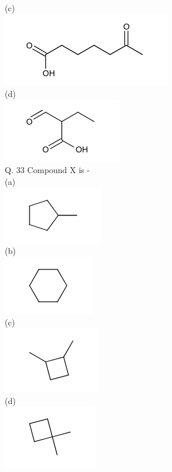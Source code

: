 \documentclass[10pt]{article}
\begin{document}
(c)\\
\includegraphics{smile-93b79b36337e5bc1e81aa86eb5efe11f89b3f004}\\
(d)\\
\includegraphics{smile-d005dd6c5a7384145c794ea92079eb066e6075c4}\\
Q. 33 Compound X is -\\
(a)\\
\includegraphics{smile-444812eaf18fbe1a7825213d85cd28a01d5035c9}\\
(b)\\
\includegraphics{smile-aba66e4917b6726344b79767b4460f7d4c86749c}\\
(c)\\
\includegraphics{smile-096f1dba2422f15c8715df3ff5c5ce4e02499cfc}\\
(d)\\
\includegraphics{smile-26cb3c340a15358a7b9e51ea299184e122af2921}
\end{document}
